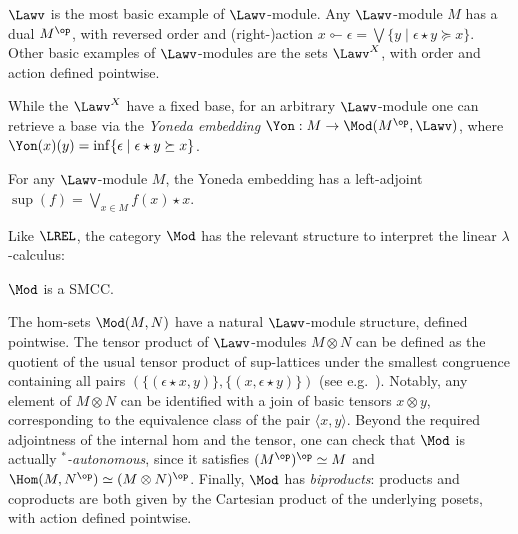  
 

$\Lawv$ is the most basic example of $\Lawv$-module.
Any $\Lawv$-module $M$ has a dual $M^{\op}$, with reversed order and (right-)action $x\multimapinv \epsilon= \bigvee\{y\mid \epsilon \star y\succeq x\}$.
 Other basic examples of $\Lawv$-modules are the sets $\Lawv^{X}$, with order and action defined pointwise. 
 
 
 While the $\Lawv^{X}$ have a fixed base, for an arbitrary $\Lawv$-module one can retrieve a base via the \emph{Yoneda embedding}
$\Yon: M \to \Mod(M^{\op},\Lawv)$, where $\Yon(x)(y)=\inf\{\epsilon\mid \epsilon\star y\succeq x\}$. 


\begin{proposition}\label{prop:yonemod}
For any $\Lawv$-module $M$, the Yoneda embedding has a left-adjoint $\sup(f)=\bigvee_{x\in M}f(x)\star x$.
\end{proposition}


Like $\LREL$, the category $\Mod$ has the relevant structure to interpret the linear $\lambda$-calculus:
\begin{proposition}
$\Mod$ is a SMCC.
\end{proposition}
The hom-sets $\Mod(M,N)$ have a natural $\Lawv$-module structure, defined pointwise. The tensor product of $\Lawv$-modules $M\otimes N$ can be defined as the quotient of the usual tensor product of sup-lattices under the smallest congruence containing all pairs $(\{(\epsilon \star x,y)\},\{(x,\epsilon\star y)\})$ (see e.g.~\cite{Russo2007}).
Notably, any element of $M\otimes N$ can be identified with a join of basic tensors $x\otimes y$, corresponding to the equivalence class of the pair $\langle x,y\rangle$.
Beyond the required adjointness of the internal hom and the tensor, one can check that $\Mod$ is actually \emph{$^{*}$-autonomous}, since it satisfies $(M^{\op})^{\op}\simeq M$ and 
$\Hom(M,N^{\op})\simeq (M\otimes N)^{\op}$.
Finally, $\Mod$ has \emph{biproducts}: products and coproducts are both given by the Cartesian product of the underlying posets, with action defined pointwise.
%



